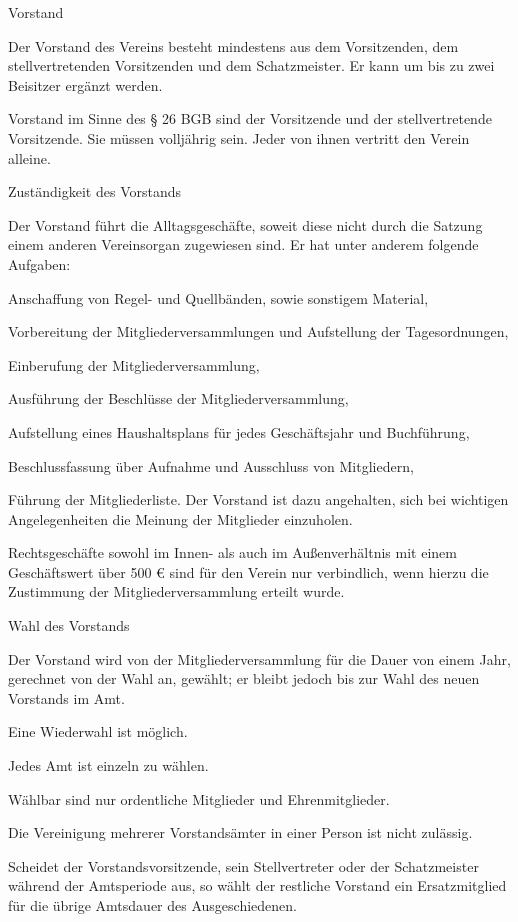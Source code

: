\begin{para}{Vorstand}
	\item Der Vorstand des Vereins besteht mindestens aus dem Vorsitzenden, dem stellvertretenden Vorsitzenden und dem Schatzmeister.
	Er kann um bis zu zwei Beisitzer ergänzt werden.
	\item Vorstand im Sinne des § 26 BGB sind der Vorsitzende und der stellvertretende Vorsitzende. Sie müssen volljährig sein. Jeder von ihnen vertritt den Verein alleine.
\end{para}

\begin{para}{Zuständigkeit des Vorstands}
	\item Der Vorstand führt die Alltagsgeschäfte, soweit diese nicht durch die Satzung einem anderen Vereinsorgan zugewiesen sind. Er hat unter anderem folgende Aufgaben:
	\begin{subpara}
		\item Anschaffung von Regel- und Quellbänden, sowie sonstigem Material,
		\item Vorbereitung der Mitgliederversammlungen und Aufstellung der Tagesordnungen,
		\item Einberufung der Mitgliederversammlung,
		\item Ausführung der Beschlüsse der Mitgliederversammlung,
		\item Aufstellung eines Haushaltsplans für jedes Geschäftsjahr und Buchführung,
		\item Beschlussfassung über Aufnahme und Ausschluss von Mitgliedern,
		\item Führung der Mitgliederliste.
		Der Vorstand ist dazu angehalten, sich bei wichtigen Angelegenheiten die Meinung der Mitglieder einzuholen.
	\end{subpara}
	\item Rechtsgeschäfte sowohl im Innen- als auch im Außenverhältnis mit einem Geschäftswert über 500 € sind für den Verein nur verbindlich, wenn hierzu die Zustimmung der Mitgliederversammlung erteilt wurde.
\end{para}

\begin{para}{Wahl des Vorstands}
	\item Der Vorstand wird von der Mitgliederversammlung für die Dauer von einem Jahr, gerechnet von der Wahl an, gewählt; er bleibt jedoch bis zur Wahl des neuen Vorstands im Amt. 
	\item Eine Wiederwahl ist möglich.
	\item Jedes Amt ist einzeln zu wählen.
	\item Wählbar sind nur ordentliche Mitglieder und Ehrenmitglieder.
	\item Die Vereinigung mehrerer Vorstandsämter in einer Person ist nicht zulässig.
	\item Scheidet der Vorstandsvorsitzende, sein Stellvertreter oder der Schatzmeister während der Amtsperiode aus, so wählt der restliche Vorstand ein Ersatzmitglied für die übrige Amtsdauer des Ausgeschiedenen.
\end{para}

